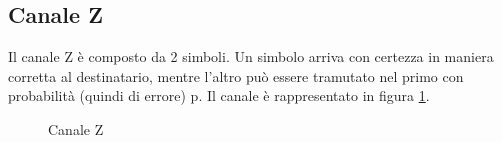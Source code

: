 \subsection{Canale Z}
Il canale Z è composto da 2 simboli. Un simbolo arriva con certezza in maniera corretta al destinatario, mentre l'altro può essere 
tramutato nel primo con probabilità (quindi di errore) p. Il canale è rappresentato in figura \ref{fig:z}.

\begin{figure}[htbp]
  \centering
  \hspace{1cm}
  \caption{Canale Z}
  \label{fig:z}
\end{figure}

